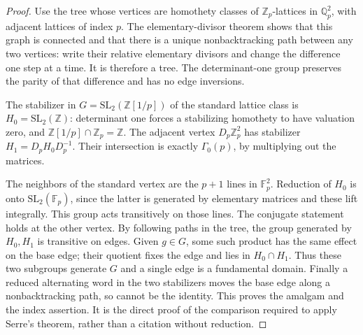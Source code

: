 \begin{proof}
Use the tree whose vertices are homothety classes of
$\mathbb Z_p$-lattices in $\mathbb Q_p^2$, with adjacent lattices
of index $p$. The elementary-divisor theorem shows that this
graph is connected and that there is a unique nonbacktracking
path between any two vertices: write their relative elementary
divisors and change the difference one step at a time. It is
therefore a tree. The determinant-one group preserves the parity
of that difference and has no edge inversions.

The stabilizer in $G=\mathrm{SL}_2(\mathbb Z[1/p])$ of the
standard lattice class is $H_0=\mathrm{SL}_2(\mathbb Z)$:
determinant one forces a stabilizing homothety to have valuation
zero, and $\mathbb Z[1/p]\cap\mathbb Z_p=\mathbb Z$.
The adjacent vertex $D_p\mathbb Z_p^2$ has stabilizer
$H_1=D_pH_0D_p^{-1}$. Their intersection is exactly
$\Gamma_0(p)$, by multiplying out the matrices.

The neighbors of the standard vertex are the $p+1$ lines in
$\mathbb F_p^2$. Reduction of $H_0$ is onto
$\mathrm{SL}_2(\mathbb F_p)$, since the latter is generated
by elementary matrices and these lift integrally. This group
acts transitively on those lines. The conjugate statement holds
at the other vertex. By following paths in the tree, the group
generated by $H_0,H_1$ is transitive on edges. Given $g\in G$,
some such product has the same effect on the base edge; their
quotient fixes the edge and lies in $H_0\cap H_1$. Thus these
two subgroups generate $G$ and a single edge is a fundamental
domain. Finally a reduced alternating word in the two stabilizers
moves the base edge along a nonbacktracking path, so cannot be
the identity. This proves the amalgam and the index assertion.
It is the direct proof of the comparison required to apply
Serre's theorem, rather than a citation without reduction.
\end{proof}

